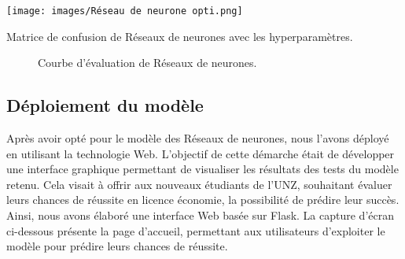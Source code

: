 \begin{minipage}[t]{0.5\textwidth}
    \begin{table}[H]
        \centering
        \setlength{\fboxsep}{5pt}
        \setlength{\fboxrule}{0.5pt}
        \texttt{[image: images/Réseau de neurone opti.png]}
        \caption{Matrice de confusion de Réseaux de neurones avec les hyperparamètres.}
    \end{table}
\end{minipage}
\begin{minipage}[t]{0.5\textwidth}
    \begin{figure}[H]
        \centering
        \setlength{\fboxsep}{5pt}
        \setlength{\fboxrule}{0.5pt}
        \caption{Courbe d'évaluation de Réseaux de neurones.}
    \end{figure}
\end{minipage}

\subsection{Déploiement du modèle}
Après avoir opté pour le modèle des Réseaux de neurones, nous l'avons déployé en utilisant la technologie Web. L'objectif de cette démarche était de développer une interface graphique permettant de visualiser les résultats des tests du modèle retenu. Cela visait à offrir aux nouveaux étudiants de l'UNZ, souhaitant évaluer leurs chances de réussite en licence économie, la possibilité de prédire leur succès. Ainsi, nous avons élaboré une interface Web basée sur Flask. La capture d'écran ci-dessous présente la page d'accueil, permettant aux utilisateurs d'exploiter le modèle pour prédire leurs chances de réussite.

